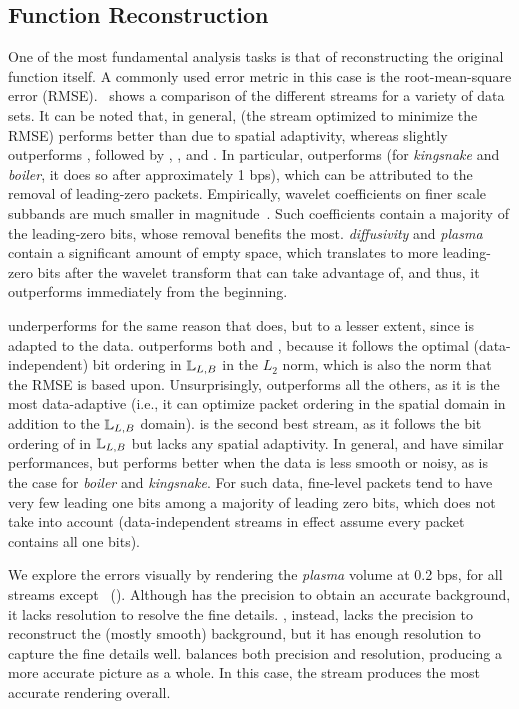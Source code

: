 \subsection{Function Reconstruction}\label{sec:rmse-optimized}

One of the most fundamental analysis tasks is that of reconstructing the original function itself. A
commonly used error metric in this case is the root-mean-square error
(RMSE).~ shows a comparison of the different streams for a variety of data
sets. It can be noted that, in general, \srop (the stream optimized to minimize the RMSE) performs
better than \srsg due to spatial adaptivity, whereas \srsg slightly outperforms \swav, followed by
\sbit, \smag, and \slvl. In particular, \sbit outperforms \slvl (for \emph{kingsnake} and
\emph{boiler}, it does so after approximately 1 bps), which can be attributed to the removal of
leading-zero packets. Empirically, wavelet coefficients on finer scale subbands are much smaller in
magnitude~\cite{spiht1996}. Such coefficients contain a majority of the leading-zero bits, whose
removal benefits \sbit the most. \emph{diffusivity} and \emph{plasma} contain a significant amount
of empty space, which translates to more leading-zero bits after the wavelet transform that \sbit
can take advantage of, and thus, it outperforms \slvl immediately from the beginning.

\smag underperforms for the same reason that \slvl does, but to a lesser extent, since \smag is
adapted to the data. \swav outperforms both \slvl and \sbit, because it follows the optimal
(data-independent) bit ordering in ${\mathbb L}_{L,B}$ in the $L_2$ norm, which is also the norm that
the RMSE is based upon. Unsurprisingly, \srop outperforms all the others, as it is the most
data-adaptive (i.e., it can optimize packet ordering in the spatial domain in addition to the
${\mathbb L}_{L,B}$ domain). \srsg is the second best stream, as it follows the bit ordering of \srop in
${\mathbb L}_{L,B}$ but lacks any spatial adaptivity. In general, \swav and \ssig have similar
performances, but \ssig performs better when the data is less smooth or noisy, as is the case for
\emph{boiler} and \emph{kingsnake}. For such data, fine-level packets tend to have very few leading
one bits among a majority of leading zero bits, which \swav does not take into account
(data-independent streams in effect assume every packet contains all one bits).

We explore the errors visually by rendering the \emph{plasma} volume at 0.2 bps, for all streams
except \srop ~(). Although \slvl has the precision to obtain an accurate
background, it lacks resolution to resolve the fine details. \sbit, instead, lacks the precision to
reconstruct the (mostly smooth) background, but it has enough resolution to capture the fine details
well. \swav balances both precision and resolution, producing a more accurate picture as a whole. In
this case, the \ssig stream produces the most accurate rendering overall.

